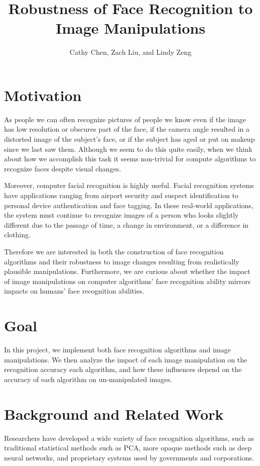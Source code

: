 \documentclass[pageno]{cos429}
\begin{document}
\title{Robustness of Face Recognition to Image Manipulations}

\author{Cathy Chen, Zach Liu, and Lindy Zeng}
\date{}
\maketitle

\section{Motivation}
As people we can often recognize pictures of people we know even if the image has low resolution or obscures part of the face, if the camera angle resulted in a distorted image of the subject's face, or if the subject has aged or put on makeup since we last saw them. Although we seem to do this quite easily, when we think about how we accomplish this task it seems non-trivial for compute algorithms to recognize faces despite visual changes.

Moreover, computer facial recognition is highly useful. Facial recognition systems have applications ranging from airport security and suspect identification to personal device authentication and face tagging\cite{huang_face_2011}. In these real-world applications, the system must continue to recognize images of a person who looks slightly different due to the passage of time, a change in environment, or a difference in clothing.

Therefore we are interested in both the construction of face recognition algorithms and their robustness to image changes resulting from realistically plausible manipulations. Furthermore, we are curious about whether the impact of image manipulations on computer algorithms' face recognition ability mirrors impacts on humans' face recognition abilities.

\section{Goal}
In this project, we implement both face recognition algorithms and image manipulations. We then analyze the impact of each image manipulation on the recognition accuracy each algorithm, and how these influences depend on the accuracy of each algorithm on un-manipulated images.

\section{Background and Related Work}
Researchers have developed a wide variety of face recognition algorithms, such as traditional statistical methods such as PCA, more opaque methods such as deep neural networks, and proprietary systems used by governments and corporations\cite{noauthor_face_nodate}\cite{schroff_facenet:_2015}\cite{sun_meet_2017}.
\end{document}
